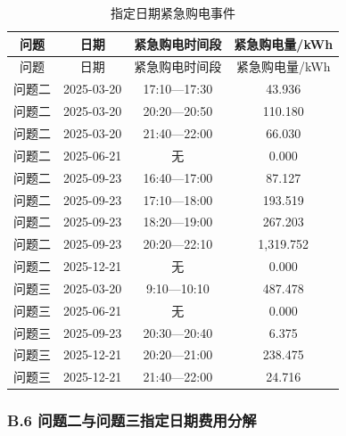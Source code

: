 \documentclass[zihao=-4,a4paper,UTF8,fontset=none]{ctexart}
\begin{document}
\begin{longtable}[]{@{}cccc@{}}
\caption{指定日期紧急购电事件}\label{tab:appendix-B-5}\tabularnewline
\toprule\noalign{}
问题 & 日期 & 紧急购电时间段 & 紧急购电量/kWh \\
\midrule\noalign{}
\endfirsthead
\toprule\noalign{}
问题 & 日期 & 紧急购电时间段 & 紧急购电量/kWh \\
\midrule\noalign{}
\endhead
\bottomrule\noalign{}
\endlastfoot
问题二 & 2025-03-20 & 17:10---17:30 & 43.936 \\
问题二 & 2025-03-20 & 20:20---20:50 & 110.180 \\
问题二 & 2025-03-20 & 21:40---22:00 & 66.030 \\
问题二 & 2025-06-21 & 无 & 0.000 \\
问题二 & 2025-09-23 & 16:40---17:00 & 87.127 \\
问题二 & 2025-09-23 & 17:10---18:00 & 193.519 \\
问题二 & 2025-09-23 & 18:20---19:00 & 267.203 \\
问题二 & 2025-09-23 & 20:20---22:10 & 1,319.752 \\
问题二 & 2025-12-21 & 无 & 0.000 \\
问题三 & 2025-03-20 & 9:10---10:10 & 487.478 \\
问题三 & 2025-06-21 & 无 & 0.000 \\
问题三 & 2025-09-23 & 20:30---20:40 & 6.375 \\
问题三 & 2025-12-21 & 20:20---21:00 & 238.475 \\
问题三 & 2025-12-21 & 21:40---22:00 & 24.716 \\
\end{longtable}

\endgroup

\clearpage\subsubsection*{B.6 问题二与问题三指定日期费用分解}

\begingroup\renewcommand{\tablename}{附表}\renewcommand{\thetable}{B-6}
\end{document}
